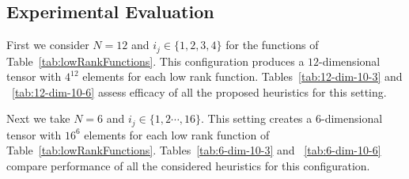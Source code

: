 \documentclass[runningheads]{llncs}
\begin{document}
\subsection{Experimental Evaluation}


First we consider $N=12$ and $i_j \in \{1, 2, 3, 4\}$ for the functions of Table~\ref{tab:lowRankFunctions}. This configuration produces a $12$-dimensional tensor with $4^{12}$ elements for each low rank function. Tables~\ref{tab:12-dim-10-3} and ~\ref{tab:12-dim-10-6} assess efficacy of all the proposed heuristics  for this setting.

Next we take $N=6$ and $i_j \in \{1,2 \cdots ,16\}$. This setting creates a $6$-dimensional tensor with $16^6$ elements for each low rank function of Table~\ref{tab:lowRankFunctions}. Tables~\ref{tab:6-dim-10-3} and ~\ref{tab:6-dim-10-6} compare performance of all the considered heuristics for this configuration.
\end{document}
